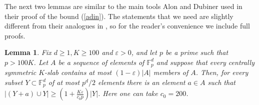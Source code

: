 \documentclass{daj}
\renewcommand{\ge}{\geqslant}
\newcommand{\FF}{\mathbb F}
\newtheorem{lemma}[theorem]{Lemma}
\theoremstyle{definition}
\theoremstyle{remark}
\theoremstyle{definition}
\theoremstyle{definition}
\begin{document}
The next two lemmas are similar to the main tools Alon and Dubiner \cite[Propositions 2.4 and 2.1, respectively]{AD} used in their proof of the bound (\ref{adin}). The statements that we need are slightly different from their analogues in \cite{AD}, so for the reader's convenience we include full proofs.

\begin{lemma}\label{ad}
Fix $d\ge 1, K \ge 100$ and $\varepsilon > 0$, and let $p$ be a prime such that $p > 100 K$. Let $A$ be a sequence of elements of $\FF_p^d$ and suppose that every centrally symmetric $K$-slab contains at most $(1 - \varepsilon)|A|$ members of $A$. Then, for every subset $Y \subset \FF_p^d$ of at most $p^d/2$ elements
there is an element $a \in A$ such that $|(Y+a) \cup Y| \ge (1+\frac{K\varepsilon}{c_0 p})|Y|$. Here one can take $c_0 = 200$.
\end{lemma}
\end{document}
